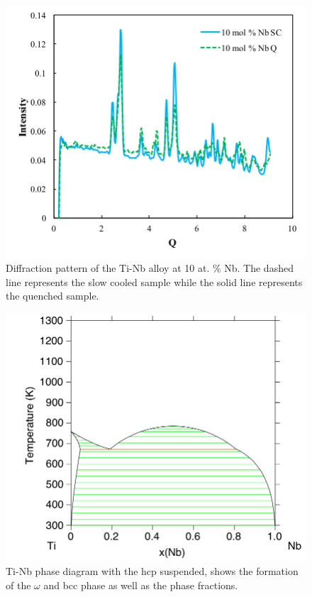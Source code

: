 \pagebreak
\begin{figure}[H]
	\centering
	\includegraphics[width=\textwidth]{Chapter-7/Figures/50diff10.png}
	\caption{Diffraction pattern of the Ti-Nb alloy at 10 at. \% Nb. The dashed line represents the slow cooled sample while the solid line represents the quenched sample.}
	\label{Ch7-figure:50diff10}
\end{figure}

\pagebreak
\begin{figure}[H]
	\centering
	\includegraphics[width=\textwidth]{Chapter-7/Figures/omegaTiNb.png}
	\caption{Ti-Nb phase diagram with the hcp suspended, shows the formation of the $\omega$ and bcc phase as well as the phase fractions.}
	\label{Ch7-figure:omegaPD}
\end{figure}